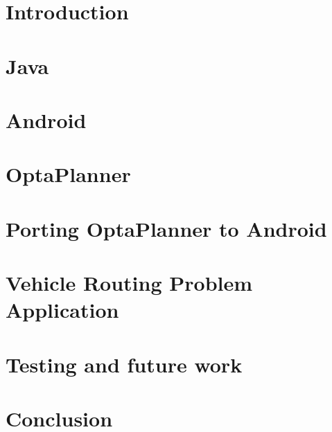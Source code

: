 \chapter{Introduction}\label{IntroductionChapter}


\chapter{Java}\label{JavaChapter}


\chapter{Android}\label{AndroidChapter}


\chapter{OptaPlanner}\label{OptaPlannerChapter}


\chapter{Porting OptaPlanner to Android}\label{PortingChapter}


\chapter{Vehicle Routing Problem Application}\label{ApplicationChapter}


\chapter{Testing and future work}\label{TestingChapter}


\chapter{Conclusion}\label{ConclusionChapter}


